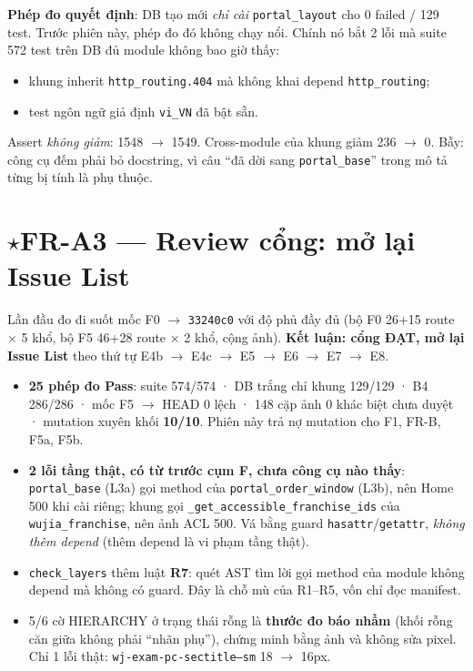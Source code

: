 \textbf{Phép đo quyết định}: DB tạo mới \emph{chỉ cài} \texttt{portal\_layout} cho 0 failed / 129 test. Trước
phiên này, phép đo đó không chạy nổi. Chính nó bắt 2 lỗi mà suite 572 test trên DB đủ module không bao giờ thấy:
\begin{itemize}[nosep]
\item khung inherit \texttt{http\_routing.404} mà không khai depend \texttt{http\_routing};
\item test ngôn ngữ giả định \texttt{vi\_VN} đã bật sẵn.
\end{itemize}
Assert \emph{không giảm}: 1548 $\to$ 1549. Cross-module của khung giảm 236 $\to$ 0. Bẫy: công cụ đếm phải bỏ
docstring, vì câu ``đã dời sang \texttt{portal\_base}'' trong mô tả từng bị tính là phụ thuộc.

\section{$\star$FR-A3 --- Review cổng: mở lại Issue List}

Lần đầu đo đi suốt mốc F0 $\to$ \texttt{33240c0} với độ phủ đầy đủ (bộ F0 26+15 route × 5 khổ, bộ F5
46+28 route × 2 khổ, cộng ảnh). \textbf{Kết luận: cổng ĐẠT, mở lại Issue List} theo thứ tự
E4b $\to$ E4c $\to$ E5 $\to$ E6 $\to$ E7 $\to$ E8.
\begin{itemize}[nosep]
\item \textbf{25 phép đo Pass}: suite 574/574 · DB trắng chỉ khung 129/129 · B4 286/286 · mốc F5 $\to$ HEAD 0 lệch ·
  148 cặp ảnh 0 khác biệt chưa duyệt · mutation xuyên khối \textbf{10/10}. Phiên này trả nợ mutation cho
  F1, FR-B, F5a, F5b.
\item \textbf{2 lỗi tầng thật, có từ trước cụm F, chưa công cụ nào thấy}: \texttt{portal\_base} (L3a) gọi method
  của \texttt{portal\_order\_window} (L3b), nên Home 500 khi cài riêng; khung gọi
  \texttt{\_get\_accessible\_franchise\_ids} của \texttt{wujia\_franchise}, nên ảnh ACL 500. Vá bằng guard
  \texttt{hasattr}/\texttt{getattr}, \emph{không thêm depend} (thêm depend là vi phạm tầng thật).
\item \texttt{check\_layers} thêm luật \textbf{R7}: quét AST tìm lời gọi method của module không depend mà
  không có guard. Đây là chỗ mù của R1--R5, vốn chỉ đọc manifest.
\item 5/6 cờ HIERARCHY ở trạng thái rỗng là \textbf{thước đo báo nhầm} (khối rỗng căn giữa không phải
  ``nhãn phụ''), chứng minh bằng ảnh và không sửa pixel. Chỉ 1 lỗi thật:
  \texttt{wj-exam-pc-sectitle--sm} 18 $\to$ 16px.
\end{itemize}

